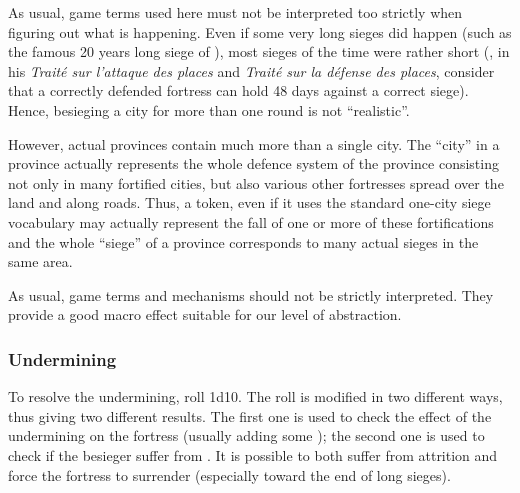 \begin{designnote}
  As usual, game terms used here must not be interpreted too strictly when
  figuring out what is happening. Even if some very long sieges did happen
  (such as the famous 20 years long siege of ), most sieges of
  the time were rather short (, in his \emph{Traité sur
    l'attaque des places} and \emph{Traité sur la défense des places},
  consider that a correctly defended fortress can hold 48 days against a
  correct siege). Hence, besieging a city for more than one round is not
  ``realistic''.

  However, actual provinces contain much more than a single city. The ``city''
  in a province actually represents the whole defence system of the province
  consisting not only in many fortified cities, but also various other
  fortresses spread over the land and along roads. Thus, a \USURE token, even
  if it uses the standard one-city siege vocabulary may actually represent the
  fall of one or more of these fortifications and the whole ``siege'' of a
  province corresponds to many actual sieges in the same area.

  As usual, game terms and mechanisms should not be strictly interpreted. They
  provide a good macro effect suitable for our level of abstraction.
\end{designnote}

\subsubsection{Undermining}
To resolve the undermining, roll 1d10. The roll is modified in two different
ways, thus giving two different results. The first one is used to check the
effect of the undermining on the fortress (usually adding some \USURE); the
second one is used to check if the besieger suffer from . It is possible to both suffer from attrition and force the
fortress to surrender (especially toward the end of long sieges).


